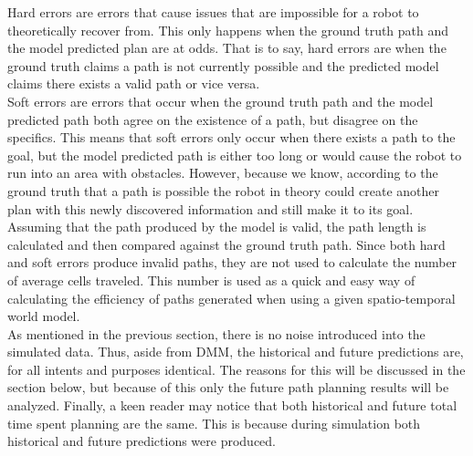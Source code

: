 Hard errors are errors that cause issues that are impossible for
a robot to theoretically recover from. This only happens when the ground truth
path and the model predicted plan are at odds. That is to say, hard errors are
when the ground truth claims a path is not currently possible and the predicted
model claims there exists a valid path or vice versa. \\

Soft errors are errors that occur when the ground truth path and the model
predicted path both agree on the existence of a path, but disagree on the
specifics. This means that soft errors only occur when there exists a path
to the goal, but the model predicted path is either too long or would cause
the robot to run into an area with obstacles. However, because we know,
according to the ground truth that a path is possible the robot in theory could
create another plan with this newly discovered information and still make it
to its goal. \\

Assuming that the path produced by the model is valid, the path
length is calculated and then compared against the ground truth path. Since
both hard and soft errors produce invalid paths, they are not used to
calculate the number of average cells traveled. This number is used as a quick and
easy way of calculating the efficiency of paths generated when using a given
spatio-temporal world model. \\

As mentioned in the previous section, there is no noise introduced
into the simulated data. Thus, aside from DMM, the historical and future
predictions are, for all intents and purposes identical. The reasons for this
will be discussed in the section below, but because of this only the future
path planning results will be analyzed. Finally, a keen reader may notice that both
historical and future total time spent planning are the same. This is because
during simulation both historical and future predictions were produced. \\

